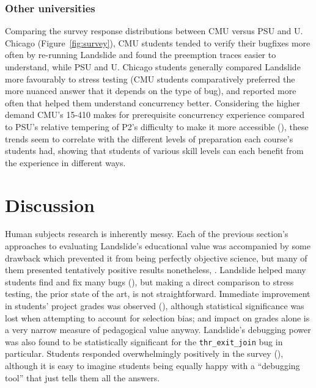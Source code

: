\subsubsection{Other universities}

Comparing the survey response distributions between CMU versus PSU and U. Chicago (Figure~\ref{fig:survey}),
CMU students tended to verify their bugfixes more often by re-running Landslide
and found the preemption traces easier to understand,
while PSU and U. Chicago students generally compared Landslide more favourably to stress testing
(CMU students comparatively preferred the more nuanced answer that it depends on the type of bug),
and reported more often that  helped them understand concurrency better.
Considering the higher demand CMU's 15-410 makes for prerequisite concurrency experience
compared to PSU's relative tempering of P2's difficulty to make it more accessible (\sect{\ref{sec:pebbles}}),
these trends seem to correlate with the different levels of preparation each course's students had,
showing that students of various skill levels
can each benefit from the experience in different ways.




\section{Discussion}
\label{sec:education-discussion}

Human subjects research is inherently messy.
Each of the previous section's approaches to evaluating Landslide's educational value
was accompanied by some drawback which prevented it from being perfectly objective science,
but many of them presented tentatively positive results nonetheless,
.
Landslide helped many students find and fix many bugs (\sect{\ref{sec:education-eval-bugfinding}}),
but making a direct comparison to stress testing, the prior state of the art, is not straightforward.
Immediate improvement in students' project grades was observed
(\sect{\ref{sec:education-eval-grades}}),
although statistical significance was lost when attempting to account for selection bias;
and impact on grades alone is a very narrow measure of pedagogical value anyway.
Landslide's debugging power was also found to be statistically significant
for the {\tt thr\_exit\_join} bug in particular.
Students responded overwhelmingly positively in the survey (\sect{\ref{sec:education-eval-survey}}),
although it is easy to imagine students being equally happy with a ``debugging tool'' that just tells them all the answers.

